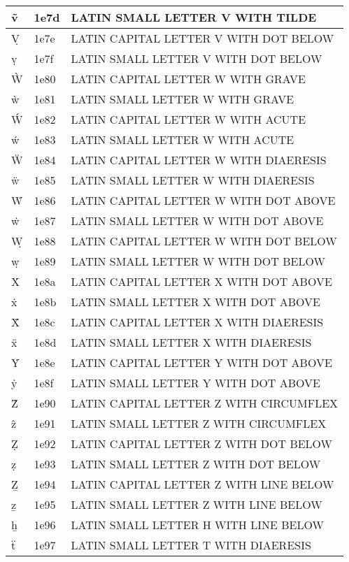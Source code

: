 \documentclass[12pt,letterpaper,openany]{book}
\begin{document}
\begin{center}
\begin{supertabular}{|m{0.25in}|m{0.5in}|m{4in}|}
			ṽ & 1e7d & LATIN SMALL LETTER V WITH TILDE\\\hline
			Ṿ & 1e7e & LATIN CAPITAL LETTER V WITH DOT BELOW\\\hline
			ṿ & 1e7f & LATIN SMALL LETTER V WITH DOT BELOW\\\hline
			Ẁ & 1e80 & LATIN CAPITAL LETTER W WITH GRAVE\\\hline
			ẁ & 1e81 & LATIN SMALL LETTER W WITH GRAVE\\\hline
			Ẃ & 1e82 & LATIN CAPITAL LETTER W WITH ACUTE\\\hline
			ẃ & 1e83 & LATIN SMALL LETTER W WITH ACUTE\\\hline
			Ẅ & 1e84 & LATIN CAPITAL LETTER W WITH DIAERESIS\\\hline
			ẅ & 1e85 & LATIN SMALL LETTER W WITH DIAERESIS\\\hline
			Ẇ & 1e86 & LATIN CAPITAL LETTER W WITH DOT ABOVE\\\hline
			ẇ & 1e87 & LATIN SMALL LETTER W WITH DOT ABOVE\\\hline
			Ẉ & 1e88 & LATIN CAPITAL LETTER W WITH DOT BELOW\\\hline
			ẉ & 1e89 & LATIN SMALL LETTER W WITH DOT BELOW\\\hline
			Ẋ & 1e8a & LATIN CAPITAL LETTER X WITH DOT ABOVE\\\hline
			ẋ & 1e8b & LATIN SMALL LETTER X WITH DOT ABOVE\\\hline
			Ẍ & 1e8c & LATIN CAPITAL LETTER X WITH DIAERESIS\\\hline
			ẍ & 1e8d & LATIN SMALL LETTER X WITH DIAERESIS\\\hline
			Ẏ & 1e8e & LATIN CAPITAL LETTER Y WITH DOT ABOVE\\\hline
			ẏ & 1e8f & LATIN SMALL LETTER Y WITH DOT ABOVE\\\hline
			Ẑ & 1e90 & LATIN CAPITAL LETTER Z WITH CIRCUMFLEX\\\hline
			ẑ & 1e91 & LATIN SMALL LETTER Z WITH CIRCUMFLEX\\\hline
			Ẓ & 1e92 & LATIN CAPITAL LETTER Z WITH DOT BELOW\\\hline
			ẓ & 1e93 & LATIN SMALL LETTER Z WITH DOT BELOW\\\hline
			Ẕ & 1e94 & LATIN CAPITAL LETTER Z WITH LINE BELOW\\\hline
			ẕ & 1e95 & LATIN SMALL LETTER Z WITH LINE BELOW\\\hline
			ẖ & 1e96 & LATIN SMALL LETTER H WITH LINE BELOW\\\hline
			ẗ & 1e97 & LATIN SMALL LETTER T WITH DIAERESIS\\\hline

\end{supertabular}
\end{center}
\end{document}
